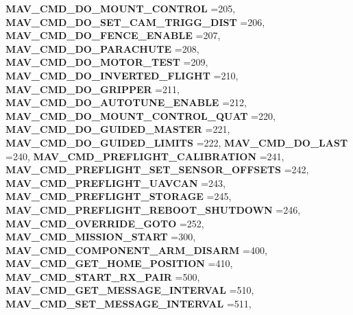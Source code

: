 \begin{DoxyCompactItemize}
\textbf{ M\+A\+V\+\_\+\+C\+M\+D\+\_\+\+D\+O\+\_\+\+M\+O\+U\+N\+T\+\_\+\+C\+O\+N\+T\+R\+OL} =205, 
\newline
\textbf{ M\+A\+V\+\_\+\+C\+M\+D\+\_\+\+D\+O\+\_\+\+S\+E\+T\+\_\+\+C\+A\+M\+\_\+\+T\+R\+I\+G\+G\+\_\+\+D\+I\+ST} =206, 
\textbf{ M\+A\+V\+\_\+\+C\+M\+D\+\_\+\+D\+O\+\_\+\+F\+E\+N\+C\+E\+\_\+\+E\+N\+A\+B\+LE} =207, 
\textbf{ M\+A\+V\+\_\+\+C\+M\+D\+\_\+\+D\+O\+\_\+\+P\+A\+R\+A\+C\+H\+U\+TE} =208, 
\textbf{ M\+A\+V\+\_\+\+C\+M\+D\+\_\+\+D\+O\+\_\+\+M\+O\+T\+O\+R\+\_\+\+T\+E\+ST} =209, 
\newline
\textbf{ M\+A\+V\+\_\+\+C\+M\+D\+\_\+\+D\+O\+\_\+\+I\+N\+V\+E\+R\+T\+E\+D\+\_\+\+F\+L\+I\+G\+HT} =210, 
\textbf{ M\+A\+V\+\_\+\+C\+M\+D\+\_\+\+D\+O\+\_\+\+G\+R\+I\+P\+P\+ER} =211, 
\textbf{ M\+A\+V\+\_\+\+C\+M\+D\+\_\+\+D\+O\+\_\+\+A\+U\+T\+O\+T\+U\+N\+E\+\_\+\+E\+N\+A\+B\+LE} =212, 
\textbf{ M\+A\+V\+\_\+\+C\+M\+D\+\_\+\+D\+O\+\_\+\+M\+O\+U\+N\+T\+\_\+\+C\+O\+N\+T\+R\+O\+L\+\_\+\+Q\+U\+AT} =220, 
\newline
\textbf{ M\+A\+V\+\_\+\+C\+M\+D\+\_\+\+D\+O\+\_\+\+G\+U\+I\+D\+E\+D\+\_\+\+M\+A\+S\+T\+ER} =221, 
\textbf{ M\+A\+V\+\_\+\+C\+M\+D\+\_\+\+D\+O\+\_\+\+G\+U\+I\+D\+E\+D\+\_\+\+L\+I\+M\+I\+TS} =222, 
\textbf{ M\+A\+V\+\_\+\+C\+M\+D\+\_\+\+D\+O\+\_\+\+L\+A\+ST} =240, 
\textbf{ M\+A\+V\+\_\+\+C\+M\+D\+\_\+\+P\+R\+E\+F\+L\+I\+G\+H\+T\+\_\+\+C\+A\+L\+I\+B\+R\+A\+T\+I\+ON} =241, 
\newline
\textbf{ M\+A\+V\+\_\+\+C\+M\+D\+\_\+\+P\+R\+E\+F\+L\+I\+G\+H\+T\+\_\+\+S\+E\+T\+\_\+\+S\+E\+N\+S\+O\+R\+\_\+\+O\+F\+F\+S\+E\+TS} =242, 
\textbf{ M\+A\+V\+\_\+\+C\+M\+D\+\_\+\+P\+R\+E\+F\+L\+I\+G\+H\+T\+\_\+\+U\+A\+V\+C\+AN} =243, 
\textbf{ M\+A\+V\+\_\+\+C\+M\+D\+\_\+\+P\+R\+E\+F\+L\+I\+G\+H\+T\+\_\+\+S\+T\+O\+R\+A\+GE} =245, 
\textbf{ M\+A\+V\+\_\+\+C\+M\+D\+\_\+\+P\+R\+E\+F\+L\+I\+G\+H\+T\+\_\+\+R\+E\+B\+O\+O\+T\+\_\+\+S\+H\+U\+T\+D\+O\+WN} =246, 
\newline
\textbf{ M\+A\+V\+\_\+\+C\+M\+D\+\_\+\+O\+V\+E\+R\+R\+I\+D\+E\+\_\+\+G\+O\+TO} =252, 
\textbf{ M\+A\+V\+\_\+\+C\+M\+D\+\_\+\+M\+I\+S\+S\+I\+O\+N\+\_\+\+S\+T\+A\+RT} =300, 
\textbf{ M\+A\+V\+\_\+\+C\+M\+D\+\_\+\+C\+O\+M\+P\+O\+N\+E\+N\+T\+\_\+\+A\+R\+M\+\_\+\+D\+I\+S\+A\+RM} =400, 
\textbf{ M\+A\+V\+\_\+\+C\+M\+D\+\_\+\+G\+E\+T\+\_\+\+H\+O\+M\+E\+\_\+\+P\+O\+S\+I\+T\+I\+ON} =410, 
\newline
\textbf{ M\+A\+V\+\_\+\+C\+M\+D\+\_\+\+S\+T\+A\+R\+T\+\_\+\+R\+X\+\_\+\+P\+A\+IR} =500, 
\textbf{ M\+A\+V\+\_\+\+C\+M\+D\+\_\+\+G\+E\+T\+\_\+\+M\+E\+S\+S\+A\+G\+E\+\_\+\+I\+N\+T\+E\+R\+V\+AL} =510, 
\textbf{ M\+A\+V\+\_\+\+C\+M\+D\+\_\+\+S\+E\+T\+\_\+\+M\+E\+S\+S\+A\+G\+E\+\_\+\+I\+N\+T\+E\+R\+V\+AL} =511, 

\end{DoxyCompactItemize}

